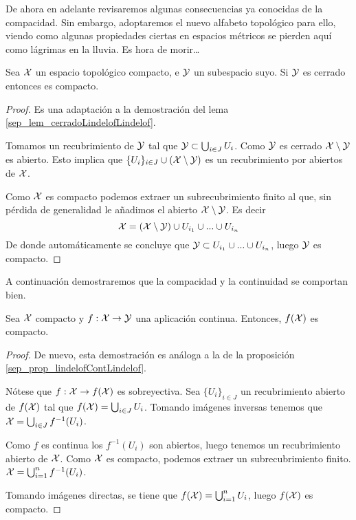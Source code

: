 De ahora en adelante revisaremos algunas consecuencias ya conocidas de la compacidad. Sin embargo, adoptaremos el nuevo alfabeto topológico para ello, viendo como algunas propiedades ciertas en espacios métricos se pierden aquí como lágrimas en la lluvia. Es hora de morir\dots

\begin{prop}\label{comp_prop_cerradoCompactoCompacto}
	Sea $\mathcal{X}$ un espacio topológico compacto, e $\mathcal{Y}$ un subespacio suyo. Si $\mathcal{Y}$ es cerrado entonces es compacto.
\end{prop}
\begin{proof}
	Es una adaptación a la demostración del lema \ref{sep_lem_cerradoLindelofLindelof}.
	
	Tomamos un recubrimiento de $\mathcal{Y}$ tal que $\mathcal{Y} \subset \bigcup_{i\in J}U_i$. Como $\mathcal{Y}$ es cerrado $\mathcal{X}\setminus \mathcal{Y}$ es abierto. Esto implica que $\{U_i\}_{i\in J}\cup (\mathcal{X}\setminus \mathcal{Y})$ es un recubrimiento por abiertos de $\mathcal{X}$.
	
	Como $\mathcal{X}$ es compacto podemos extraer un subrecubrimiento finito al que, sin pérdida de generalidad le añadimos el abierto $\mathcal{X}\setminus \mathcal{Y}$. Es decir
	\begin{equation*}
		\mathcal{X} = (\mathcal{X}\setminus\mathcal{Y}) \cup U_{i_1} \cup ... \cup U_{i_n}
	\end{equation*}
	De donde automáticamente se concluye que $\mathcal{Y} \subset U_{i_1} \cup ... \cup U_{i_n}$, luego $\mathcal{Y}$ es compacto.
\end{proof}

A continuación demostraremos que la compacidad y la continuidad se comportan bien.

\begin{prop}
	\label{comp_prop_compContComp}
	Sea $\mathcal{X}$ compacto y $f:\mathcal{X} \to \mathcal{Y}$ una aplicación continua. Entonces, $f(\mathcal{X})$ es compacto.
\end{prop}
\begin{proof}
	De nuevo, esta demostración es análoga a la de la proposición \ref{sep_prop_lindelofContLindelof}.
	
	Nótese que $f:\mathcal{X}\to f(\mathcal{X})$ es sobreyectiva. Sea $\{U_i\}_{i\in J}$ un recubrimiento abierto de $f(\mathcal{X})$ tal que $f(\mathcal{X})=\bigcup_{i\in J}U_i$. Tomando imágenes inversas tenemos que $\mathcal{X}=\bigcup_{i\in J}f^{-1}(U_i)$. 
	
	Como $f$ es continua los $f^{-1}(U_i)$ son abiertos, luego tenemos un recubrimiento abierto de $\mathcal{X}$. Como $\mathcal{X}$ es compacto, podemos extraer un subrecubrimiento finito. $\mathcal{X}=\bigcup_{i=1}^nf^{-1}(U_i)$.
	
	Tomando imágenes directas, se tiene que $f(\mathcal{X})=\bigcup_{i=1}^nU_i$, luego $f(\mathcal{X})$ es compacto.
\end{proof}

